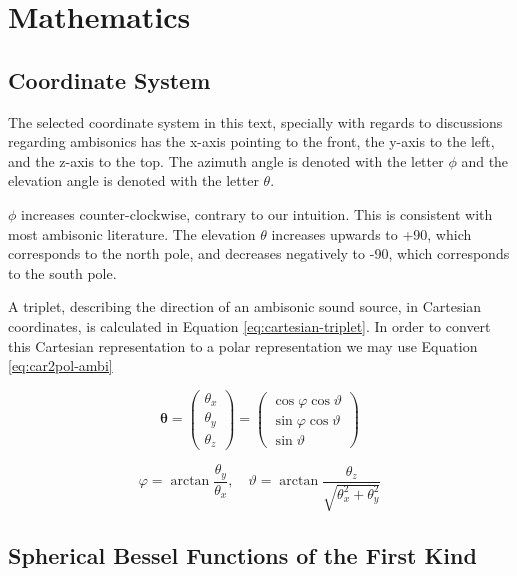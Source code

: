 \chapter{Mathematics} \label{ch:appendix-math}

\section{Coordinate System}

The selected coordinate system in this text, specially with regards to discussions regarding ambisonics has the x-axis pointing to the front, the y-axis to the left, and the z-axis to the top. The azimuth angle is denoted with the letter $\phi$ and the elevation angle is denoted with the letter $\theta$. 

$\phi$ increases counter-clockwise, contrary to our intuition. This is consistent with most ambisonic literature. The elevation $\theta$ increases upwards to +90\textdegree, which corresponds to the north pole, and decreases negatively to -90\textdegree, which corresponds to the south pole. 

A triplet, describing the direction of an ambisonic sound source, in Cartesian coordinates, is calculated in Equation \ref{eq:cartesian-triplet}. In order to convert this Cartesian representation to a polar representation we may use Equation \ref{eq:car2pol-ambi}

\begin{equation}
\boldsymbol{\theta}=\left(\begin{array}{l}
\theta_{x} \\
\theta_{y} \\
\theta_{z}
\end{array}\right)=\left(\begin{array}{c}
\cos \varphi \cos \vartheta \\
\sin \varphi \cos \vartheta \\
\sin \vartheta
\end{array}\right)
\label{eq:cartesian-triplet}
\end{equation}

\begin{equation}
\varphi=\arctan \frac{\theta_{y}}{\theta_{x}}, \quad \vartheta=\arctan \frac{\theta_{z}}{\sqrt{\theta_{x}^{2}+\theta_{y}^{2}}}
\label{eq:car2pol-ambi}
\end{equation}

\section{Spherical Bessel Functions of the First Kind}

